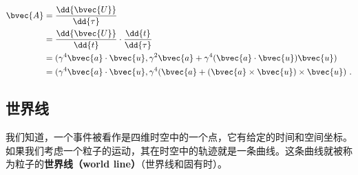 \begin{equation}
\begin{aligned}
%
\bvec{A}&=\frac{\dd{\bvec{U}}}{\dd{\tau}}\\&=\frac{\dd{\bvec{U}}}{\dd{t}}\cdot\frac{\dd{t}}{\dd{\tau}}\\&=(\gamma^4\bvec{a}\cdot\bvec{u}, \gamma^2\bvec{a}+\gamma^4(\bvec{a}\cdot\bvec{u})\bvec{u})\\&=(\gamma^4\bvec{a}\cdot\bvec{u}, \gamma^4(\bvec{a}+(\bvec{a}\times\bvec{u})\times\bvec{u})~.
%
\end{aligned}
\end{equation}

\subsection{世界线}

我们知道，一个事件被看作是四维时空中的一个点，它有给定的时间和空间坐标。如果我们考虑一个粒子的运动，其在时空中的轨迹就是一条曲线。这条曲线就被称为粒子的\textbf{世界线（world line）}（世界线和固有时）。


